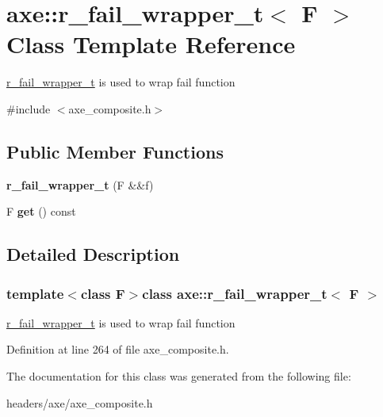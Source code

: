 \hypertarget{classaxe_1_1r__fail__wrapper__t}{\section{axe\+:\+:r\+\_\+fail\+\_\+wrapper\+\_\+t$<$ F $>$ Class Template Reference}
\label{classaxe_1_1r__fail__wrapper__t}
}


\hyperlink{classaxe_1_1r__fail__wrapper__t}{r\+\_\+fail\+\_\+wrapper\+\_\+t} is used to wrap fail function  




{\ttfamily \#include $<$axe\+\_\+composite.\+h$>$}

\subsection*{Public Member Functions}
\begin{DoxyCompactItemize}
\item 
\hypertarget{classaxe_1_1r__fail__wrapper__t_a7744cabeec45be21b6028b169087a3f4}{{\bfseries r\+\_\+fail\+\_\+wrapper\+\_\+t} (F \&\&f)}\label{classaxe_1_1r__fail__wrapper__t_a7744cabeec45be21b6028b169087a3f4}

\item 
\hypertarget{classaxe_1_1r__fail__wrapper__t_af684376336080d84d2e0a46313756f37}{F {\bfseries get} () const }\label{classaxe_1_1r__fail__wrapper__t_af684376336080d84d2e0a46313756f37}

\end{DoxyCompactItemize}


\subsection{Detailed Description}
\subsubsection*{template$<$class F$>$class axe\+::r\+\_\+fail\+\_\+wrapper\+\_\+t$<$ F $>$}

\hyperlink{classaxe_1_1r__fail__wrapper__t}{r\+\_\+fail\+\_\+wrapper\+\_\+t} is used to wrap fail function 

Definition at line 264 of file axe\+\_\+composite.\+h.



The documentation for this class was generated from the following file\+:\begin{DoxyCompactItemize}
\item 
headers/axe/axe\+\_\+composite.\+h\end{DoxyCompactItemize}
